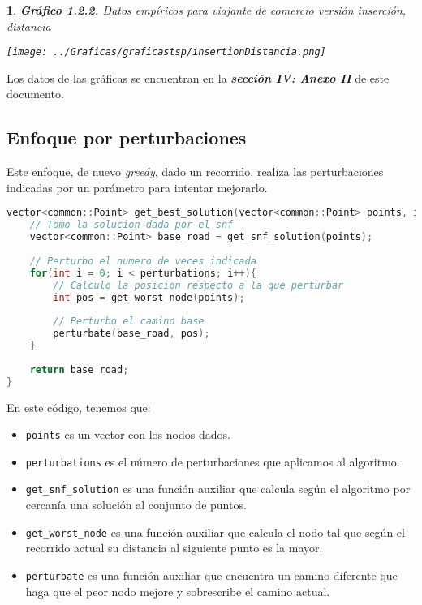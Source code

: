 \documentclass[10pt, a4paper]{article}
\theoremstyle{theorem-style}
\newtheorem*{datos}{}
\theoremstyle{theorem-style}
\theoremstyle{definition-style}
\theoremstyle{remark-style}
\theoremstyle{example-style}
\theoremstyle{definition-style}
\theoremstyle{remark-style}
\begin{document}
\begin{datos}
	{\bf\sffamily Gráfico 1.2.2.} {\sffamily Datos empíricos para viajante de comercio versión inserción, distancia}\\
	\vspace{-0.7cm}
	\begin{center}
		\texttt{[image: ../Graficas/graficastsp/insertionDistancia.png]}
	\end{center}	
\end{datos}

Los datos de las gráficas se encuentran en la \textbf{\emph{sección IV: Anexo II}} de este documento.

\subsection{Enfoque por perturbaciones}

Este enfoque, de nuevo \emph{greedy}, dado un recorrido, realiza las perturbaciones indicadas por un parámetro para intentar mejorarlo.

\begin{lstlisting}[language=C]
vector<common::Point> get_best_solution(vector<common::Point> points, int perturbations){
	// Tomo la solucion dada por el snf
	vector<common::Point> base_road = get_snf_solution(points);
	
	// Perturbo el numero de veces indicada
	for(int i = 0; i < perturbations; i++){
		// Calculo la posicion respecto a la que perturbar
		int pos = get_worst_node(points);
		
		// Perturbo el camino base
		perturbate(base_road, pos);
	}
	
	return base_road;
}
\end{lstlisting}

En este código, tenemos que:
\begin{itemize}
	\item \texttt{points} es un vector con los nodos dados. 
	\item \texttt{perturbations} es el número de perturbaciones que aplicamos al algoritmo. 
	\item \texttt{get\_snf\_solution} es una función auxiliar que calcula según el algoritmo por cercanía una solución al conjunto de puntos.
	\item \texttt{get\_worst\_node} es una función auxiliar que calcula el nodo tal que según el recorrido actual su distancia al siguiente punto es la mayor.
	\item \texttt{perturbate} es una función auxiliar que encuentra un camino diferente que haga que el peor nodo mejore y sobrescribe el camino actual.
\end{itemize}
\end{document}
